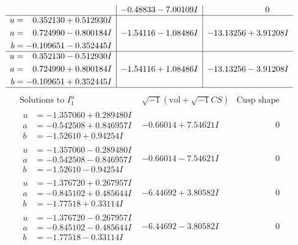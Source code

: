 \documentclass[1p]{elsarticle_modified}
\theoremstyle{definition}
\newcommand{\I}{\sqrt{-1}}
\begin{document}
$$\begin{array}{c|c|c}
 & -0.48833 - 7.00109 I & \phantom{-0.000000 } 0 \\ \hline\begin{aligned}
u &= \phantom{-}0.352130 + 0.512930 I \\
a &= \phantom{-}0.724990 - 0.800184 I \\
b &= -0.109651 - 0.352445 I\end{aligned}
 & -1.54116 - 1.08486 I & -13.13256 + 3.91208 I \\ \hline\begin{aligned}
u &= \phantom{-}0.352130 - 0.512930 I \\
a &= \phantom{-}0.724990 + 0.800184 I \\
b &= -0.109651 + 0.352445 I\end{aligned}
 & -1.54116 + 1.08486 I & -13.13256 - 3.91208 I\\
 \hline 
 \end{array}$$\newpage$$\begin{array}{c|c|c}  
\text{Solutions to }I^u_{1}& \I (\text{vol} + \sqrt{-1}CS) & \text{Cusp shape}\\
 \hline 
\begin{aligned}
u &= -1.357060 + 0.289480 I \\
a &= -0.542508 + 0.846957 I \\
b &= -1.52610 + 0.94254 I\end{aligned}
 & -0.66014 + 7.54621 I & \phantom{-0.000000 } 0 \\ \hline\begin{aligned}
u &= -1.357060 - 0.289480 I \\
a &= -0.542508 - 0.846957 I \\
b &= -1.52610 - 0.94254 I\end{aligned}
 & -0.66014 - 7.54621 I & \phantom{-0.000000 } 0 \\ \hline\begin{aligned}
u &= -1.376720 + 0.267957 I \\
a &= -0.845102 + 0.485644 I \\
b &= -1.77518 + 0.33114 I\end{aligned}
 & -6.44692 + 3.80582 I & \phantom{-0.000000 } 0 \\ \hline\begin{aligned}
u &= -1.376720 - 0.267957 I \\
a &= -0.845102 - 0.485644 I \\
b &= -1.77518 - 0.33114 I\end{aligned}
 & -6.44692 - 3.80582 I & \phantom{-0.000000 } 0 \\ \hline\begin{aligned}

\end{aligned}
\end{array}$$
\end{document}
